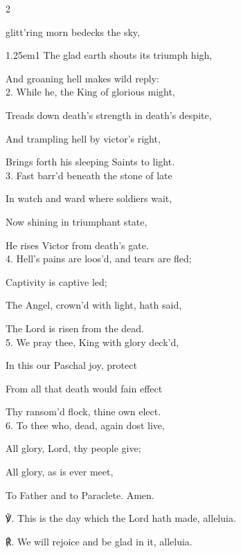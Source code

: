\mattinsOfficeHymn\label{EasterDayMattins}

\begin{multicols}{2}
	\sloppy

 glitt'ring morn bedecks the sky,


\begin{hangparas}{1.25em}{1}
The glad earth shouts its triumph high,

And groaning hell makes wild reply:\\

2. While he, the King of glorious might,

Treads down death's strength in death's despite,

And trampling hell by victor's right,

Brings forth his sleeping Saints to light.\\

3. Fast barr'd beneath the stone of late

In watch and ward where soldiers wait,

Now shining in triumphant state,

He rises Victor from death's gate.\\

4. Hell's pains are loos'd, and tears are fled;

Captivity is captive led;

The Angel, crown'd with light, hath said,

The Lord is risen from the dead.\\

5. We pray thee, King with glory deck'd,

In this our Paschal joy, protect

From all that death would fain effect

Thy ransom'd flock, thine own elect.\\

6. To thee who, dead, again dost live,

All glory, Lord, thy people give;

All glory, as is ever meet,

To Father and to Paraclete. Amen.\\
\end{hangparas}

℣. This is the day which the Lord hath made, alleluia.

℟. We will rejoice and be glad in it, alleluia.


\end{multicols}

